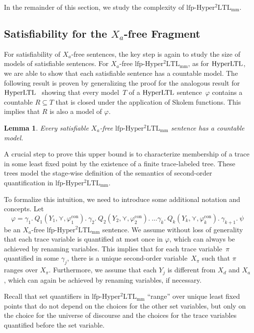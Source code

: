 \documentclass[dvipsnames,10pt,a4paper]{amsart}
\newtheorem{lem}[thm]{Lemma}
\theoremstyle{definition}
\theoremstyle{remark}
\renewcommand{\phi}{\varphi}
\newcommand{\hyltl}{\mathrm{Hyper\-LTL}\xspace}
\newcommand{\lfpsohyltlfp}{\mathrm{lfp\text{-}{Hyper^2LTL_{\mathrm{mm}}}}\xspace}
\newcommand{\univar}{X_a}
\newcommand{\unidisvar}{X_d}
\newcommand{\smallest}{\curlyvee}
\newcommand{\myquot}[1]{``#1''}
\newcommand{\con}{\mathrm{con}}
\newcommand{\quant}{Q}
\begin{document}
In the remainder of this section, we study the complexity of $\lfpsohyltlfp$. 

\subsection{\texorpdfstring{Satisfiability for the \boldmath$\univar$-free Fragment}{Satisfiability for the Xa-free Fragment}}
\label{subsec_lfpsatcw}
For satisfiability of $\univar$-free sentences, the key step is again to study the size of models of satisfiable sentences. 
For $\univar$-free $\lfpsohyltlfp$, as for $\hyltl$, we are able to show that each satisfiable sentence has a countable model.
The following result is proven by generalizing the proof for the analogous result for $\hyltl$~\cite{FZ17} showing that every model~$T$ of a $\hyltl$ sentence~$\phi$ contains a countable $R\subseteq T$ that is closed under the application of Skolem functions. This implies that $R$ is also a model of $\phi$.

\begin{lem}
\label{lemma_lfpcwmodelsize}
Every satisfiable $\univar$-free $\lfpsohyltlfp$ sentence has a countable model.
\end{lem}

A crucial step to prove this upper bound is to characterize membership of a trace in some least fixed point by the existence of a finite trace-labeled tree. These trees model the stage-wise definition of the semantics of second-order quantification in $\lfpsohyltlfp$.

To formalize this intuition, we need to introduce some additional notation and concepts. 
Let \[
\phi = 
\gamma_1.\ \quant_1(Y_1, \smallest, \phi_1^\con).\ 
\gamma_2.\ \quant_2(Y_2, \smallest, \phi_2^\con).\ 
\ldots 
\gamma_k.\ \quant_k(Y_k, \smallest, \phi_k^\con).\
\gamma_{k+1}.\
\psi
\]
be an $\univar$-free $\lfpsohyltlfp$ sentence.
We assume without loss of generality that each trace variable is quantified at most once in $\varphi$, which can always be achieved by renaming variables. This implies that for each trace variable~$\pi$ quantified in some $\gamma_j$, there is a unique second-order variable~$X_\pi$ such that $\pi$ ranges over $X_\pi$.
Furthermore, we assume that each $Y_j$ is different from $\unidisvar$ and $\univar$, which can again be achieved by renaming variables, if necessary.

Recall that set quantifiers in $\lfpsohyltlfp$ \myquot{range} over unique least fixed points that do not depend on the choices for the other set variables, but only on the choice for the universe of discourse and the choices for the trace variables quantified before the set variable.
\end{document}
